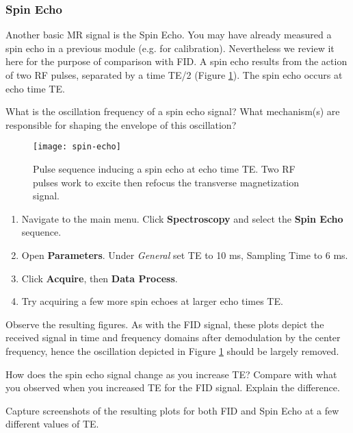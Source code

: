 \subsubsection{Spin Echo}

Another basic MR signal is the Spin Echo. You may have already measured a spin echo in a previous module (e.g. for calibration). Nevertheless we review it here for the purpose of comparison with FID. A spin echo results from the action of two RF pulses, separated by a time TE/2 (Figure \ref{fig:spec-spin-echo}). The spin echo occurs at echo time TE.

\vspace{5mm}

\noindent{}\color{red}
What is the oscillation frequency of a spin echo signal? What mechanism(s) are responsible for shaping the envelope of this oscillation?
\color{black}

\begin{figure}[h]
    \centering
    \texttt{[image: spin-echo]}
    \captionsetup{width=.9\textwidth}
    \caption{\label{fig:spec-spin-echo} Pulse sequence inducing a spin echo at echo time TE. Two RF pulses work to excite then refocus the transverse magnetization signal.}
\end{figure}
\vspace{5mm}

\begin{enumerate}
\item	Navigate to the main menu. Click \textbf{Spectroscopy} and select the \textbf{Spin Echo} sequence.
\item	Open \textbf{Parameters}. Under \emph{General} set TE to 10 ms, Sampling Time to 6 ms.
\item	Click \textbf{Acquire}, then \textbf{Data Process}.
\item Try acquiring a few more spin echoes at larger echo times TE.
\end{enumerate}

Observe the resulting figures. As with the FID signal, these plots depict the received signal in time and frequency domains after demodulation by the center frequency, hence the oscillation depicted in Figure \ref{fig:spec-spin-echo} should be largely removed.

\vspace{5mm}

\noindent{}\color{red}
How does the spin echo signal change as you increase TE? Compare with what you observed when you increased TE for the FID signal. Explain the difference.
\color{black}

\vspace{5mm}

\noindent{}\color{red}
Capture screenshots of the resulting plots for both FID and Spin Echo at a few different values of TE.
\color{black}
